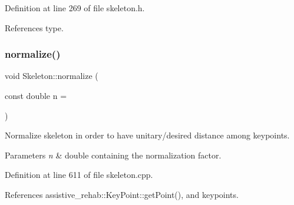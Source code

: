 Definition at line 269 of file skeleton.\+h.


\begin{DoxyCode}{0}

\end{DoxyCode}


References type.

\mbox{\label{classassistive__rehab_1_1Skeleton_a7753cc8d2b43e27eaf7bf9ef640a99cb}} 
\subsubsection{\texorpdfstring{normalize()}{normalize()}}
{\footnotesize\ttfamily void Skeleton\+::normalize (\begin{DoxyParamCaption}\item[{const double}]{n = {} }\end{DoxyParamCaption})}



Normalize skeleton in order to have unitary/desired distance among keypoints. 


\begin{DoxyParams}{Parameters}
{\em n} & double containing the normalization factor. \\
\hline
\end{DoxyParams}


Definition at line 611 of file skeleton.\+cpp.


\begin{DoxyCode}{0}

\end{DoxyCode}


References assistive\+\_\+rehab\+::\+Key\+Point\+::get\+Point(), and keypoints.

\mbox{\label{classassistive__rehab_1_1Skeleton_a3ecc7418af653c88e40d41bb379b7271}} 
